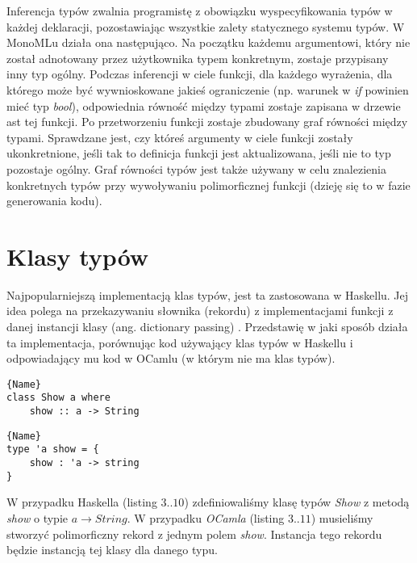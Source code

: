 \documentclass[declaration,shortabstract]{iithesis}
\begin{document}
Inferencja typów zwalnia programistę z obowiązku wyspecyfikowania typów w
każdej deklaracji, pozostawiając wszystkie zalety statycznego systemu typów.
W MonoMLu działa ona następująco. Na początku każdemu argumentowi,
który nie został adnotowany przez użytkownika typem konkretnym, zostaje 
przypisany inny typ ogólny. Podczas inferencji w ciele funkcji, dla 
każdego wyrażenia, dla którego może być wywnioskowane jakieś ograniczenie 
(np. warunek w \textit{if} powinien mieć typ \textit{bool}), odpowiednia 
równość między typami zostaje zapisana w drzewie ast tej funkcji. Po 
przetworzeniu funkcji zostaje zbudowany graf równości między typami. 
Sprawdzane jest, czy któreś argumenty w ciele funkcji zostały ukonkretnione, 
jeśli tak to definicja funkcji jest aktualizowana, jeśli nie to typ pozostaje
ogólny. Graf równości typów jest także używany w celu znalezienia konkretnych 
typów przy wywoływaniu polimorficznej funkcji (dzieję się to w fazie 
generowania kodu). 

\section{Klasy typów}
Najpopularniejszą implementacją klas typów, jest ta zastosowana w Haskellu. 
Jej idea polega na przekazywaniu słownika (rekordu) z implementacjami funkcji 
z danej instancji klasy (ang. dictionary passing) 
\cite{type_class_wadler88, implementing_type_classes}. Przedstawię w jaki sposób 
działa ta implementacja, porównując kod używający klas typów w Haskellu i 
odpowiadający mu kod w OCamlu (w którym nie ma klas typów).

\noindent\begin{minipage}{.45\textwidth}
\begin{lstlisting}[caption=Deklaracja klasy typów w Haskellu, frame=tlrb]{Name}
class Show a where 
    show :: a -> String
\end{lstlisting}
\end{minipage}\hfill
\begin{minipage}{.45\textwidth}
\begin{lstlisting}[caption=Deklaracja odpowiednika klasy typów w OCamlu z
użyciem metody przekazywania słownika, frame=tlrb]{Name}
type 'a show = { 
    show : 'a -> string 
} 
\end{lstlisting}
\end{minipage}

W przypadku Haskella (listing $3..10$) zdefiniowaliśmy klasę typów 
\textit{Show} z metodą 
\textit{show} o typie $a \rightarrow String$. W przypadku \textit
{OCamla} (listing $3..11$) musieliśmy stworzyć polimorficzny rekord z jednym 
polem \textit{show}. Instancja tego rekordu będzie instancją tej klasy 
dla danego typu. 
\end{document}
